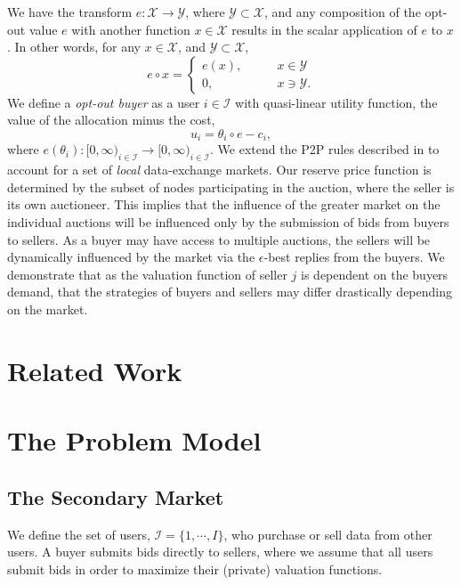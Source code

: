 \documentclass[12pt]{article}
\theoremstyle{definition}
\newcommand{\mcI}{\mathcal{I}}
\begin{document}
\begin{multicols}{2}
We have the transform $e: \mathcal{X} \rightarrow \mathcal{Y}$, where
$\mathcal{Y} \subset \mathcal{X}$, and any
composition of the opt-out value $e$ with another function $x \in \mathcal{X}$
results in the scalar application of $e$ to $x$. In other words, for any
$x\in\mathcal{X}$, and $\mathcal{Y} \subset \mathcal{X}$,
$$
    e\circ x = \begin{cases} e(x), \qquad &x \in \mathcal{Y} \\
                             0, \qquad &x \ni \mathcal{Y}.
\end{cases}
$$
We define a \emph{opt-out buyer} as a user $i\in\mcI$ with quasi-linear utility
function, the value of the allocation minus the cost,
\begin{equation}\label{buyerutility}
    u_i = \theta_i \circ e - c_i,
\end{equation}
where $e(\theta_i) : [0, \infty)_{i\in\mcI} \rightarrow [0,\infty)_{i\in\mcI}$. 
We extend the P2P rules described
in \cite{semret} to account for a set of \emph{local} data-exchange markets.
Our reserve price function is determined by the subset of nodes participating in the
auction, where the seller is its own auctioneer. This implies that the influence of the greater market on the individual
auctions will be influenced only by the submission of bids from buyers to
sellers. As a buyer may have access to multiple auctions, the sellers will be
dynamically influenced by the market via the $\epsilon$-best replies from the
buyers. We demonstrate that as the valuation function of seller $j$ is dependent
on the buyers demand, that the strategies of buyers and sellers may differ
drastically depending on the market.

\section{Related Work}

\section{The Problem Model}
\subsection{The Secondary Market}

We define the set of users, $\mcI = \lbrace 1, \cdots, I\rbrace$, who purchase or sell
data from other users. A buyer submits bids directly to sellers, where we
assume that all users submit bids in order to maximize their
(private) valuation functions. 


\end{multicols}
\end{document}

